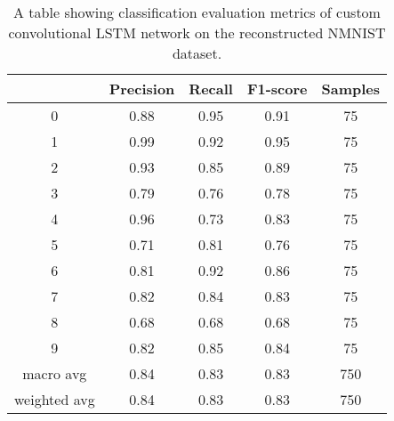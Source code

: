 \begin{table}[htb]
    \centering
    \begin{tabular}{|| c | c | c | c | c ||}
        \hline
             & Precision & Recall & F1-score & Samples \\
        \hline \hline
        0            & 0.88 & 0.95 & 0.91 & 75  \\
        \hline
        1            & 0.99 & 0.92 & 0.95 & 75  \\
        \hline
        2            & 0.93 & 0.85 & 0.89 & 75  \\
        \hline
        3            & 0.79 & 0.76 & 0.78 & 75  \\
        \hline
        4            & 0.96 & 0.73 & 0.83 & 75  \\
        \hline
        5            & 0.71 & 0.81 & 0.76 & 75  \\
        \hline
        6            & 0.81 & 0.92 & 0.86 & 75  \\
        \hline
        7            & 0.82 & 0.84 & 0.83 & 75  \\
        \hline
        8            & 0.68 & 0.68 & 0.68 & 75  \\
        \hline
        9            & 0.82 & 0.85 & 0.84 & 75  \\
        \hline
        macro avg    & 0.84 & 0.83 & 0.83 & 750 \\
        \hline
        weighted avg & 0.84 & 0.83 & 0.83 & 750 \\
        \hline
    \end{tabular}
    \caption{A table showing classification evaluation metrics of custom convolutional LSTM network on the reconstructed NMNIST dataset.}
    \label{tab:custom_conv_lstm_nmnist_recon_evaluation_metrics}
\end{table}

